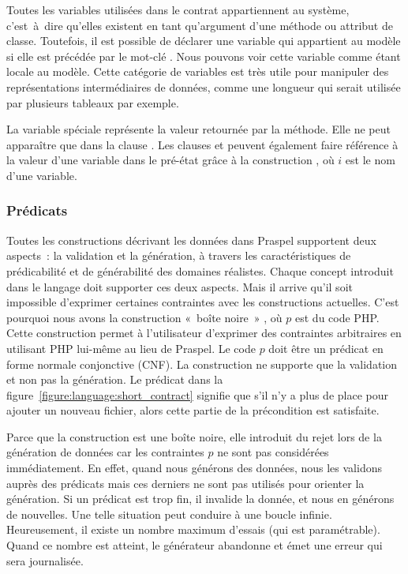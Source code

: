 Toutes les variables utilisées dans le contrat appartiennent au système,
c'est~à~dire qu'elles existent en tant qu'argument d'une méthode ou attribut de
classe. Toutefois, il est possible de déclarer une variable qui appartient au
modèle si elle est précédée par le mot-clé . Nous pouvons voir cette
variable comme étant {\strong locale} au modèle. Cette catégorie de variables
est très utile pour manipuler des représentations intermédiaires de données,
comme une longueur qui serait utilisée par plusieurs tableaux par exemple.

La variable spéciale \aresult représente la valeur {\strong retournée} par la
méthode. Elle ne peut apparaître que dans la clause \aensures. Les clauses
\aensures et \athrowable peuvent également faire {\strong référence} à la valeur
d'une variable dans le pré-état grâce à la construction , où $i$ est le
nom d'une variable.

\subsubsection{Prédicats}

Toutes les constructions décrivant les données dans Praspel supportent deux
aspects~: la validation et la génération, à travers les caractéristiques de
prédicabilité et de générabilité des domaines réalistes. Chaque concept
introduit dans le langage doit supporter ces deux aspects. Mais il arrive qu'il
soit impossible d'exprimer certaines contraintes avec les constructions
actuelles. C'est pourquoi nous avons la construction «~boîte noire~» ,
où $p$ est du code PHP. Cette construction permet à l'utilisateur d'exprimer des
contraintes arbitraires en utilisant PHP lui-même au lieu de Praspel. Le code
$p$ doit être un prédicat en forme normale {\strong conjonctive} (CNF). La
construction  ne supporte que la validation et non pas la génération.
Le prédicat  dans la figure~\ref{figure:language:short_contract} signifie
que s'il n'y a plus de place pour ajouter un nouveau fichier, alors cette partie
de la précondition est satisfaite.

Parce que la construction  est une boîte noire, elle introduit du rejet
lors de la génération de données car les contraintes $p$ ne sont pas considérées
immédiatement. En effet, quand nous générons des données, nous les validons
auprès des prédicats mais ces derniers ne sont pas utilisés pour orienter la
génération. Si un prédicat est trop fin, il invalide la donnée, et nous en
générons de nouvelles. Une telle situation peut conduire à une boucle infinie.
Heureusement, il existe un nombre maximum d'essais (qui est paramétrable). Quand
ce nombre est atteint, le générateur abandonne et émet une erreur qui sera
journalisée.


